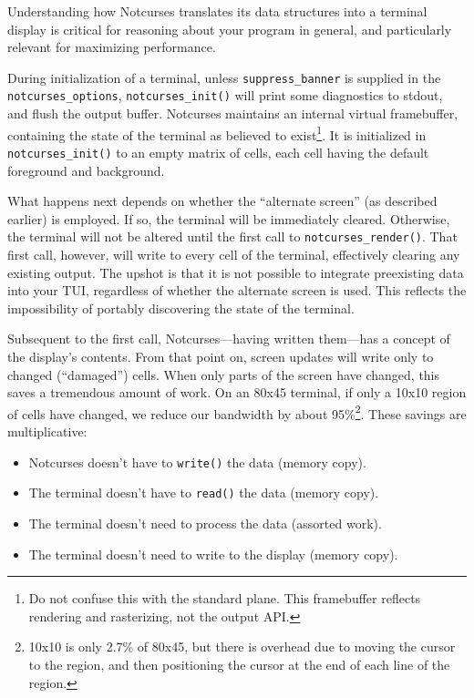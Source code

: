 \documentclass[letterpaper,10pt]{article}
\newenvironment{denseitemize}{
  \begin{itemize}
      \setlength{\itemsep}{0pt}
}{
  \end{itemize}
}
\begin{document}
Understanding how Notcurses translates its data structures into a terminal
display is critical for reasoning about your program in general, and particularly
relevant for maximizing performance.

During initialization of a terminal, unless \texttt{suppress\_banner} is supplied
in the \texttt{notcurses\_options}, \texttt{notcurses\_init()} will print some
diagnostics to stdout, and flush the output buffer. Notcurses maintains an
internal virtual framebuffer, containing the state of the terminal as believed
to exist\footnote{Do not confuse this with the standard plane. This framebuffer
reflects rendering and rasterizing, not the output API.}. It is initialized in
\texttt{notcurses\_init()} to an empty matrix of cells, each cell having the
default foreground and background.

What happens next depends on whether the ``alternate screen'' (as described
earlier) is employed. If so, the terminal will be immediately cleared.
Otherwise, the terminal will not be altered until the first call to
\texttt{notcurses\_render()}. That first call, however, will write to every
cell of the terminal, effectively clearing any existing output. The upshot is
that it is not possible to integrate preexisting data into your TUI, regardless
of whether the alternate screen is used. This reflects the impossibility of
portably discovering the state of the terminal.

Subsequent to the first call, Notcurses---having written them---has a concept
of the display's contents. From that point on, screen updates will write only
to changed (``damaged'') cells. When only parts of the screen have changed,
this saves a tremendous amount of work. On an 80x45 terminal, if only a 10x10
region of cells have changed, we reduce our bandwidth by about
95\%\footnote{10x10 is only 2.7\% of 80x45, but there is overhead due to moving
the cursor to the region, and then positioning the cursor at the end of each
line of the region.}. These savings are multiplicative:

\begin{denseitemize}
\item{Notcurses doesn't have to \texttt{write()} the data (memory copy).}
\item{The terminal doesn't have to \texttt{read()} the data (memory copy).}
\item{The terminal doesn't need to process the data (assorted work).}
\item{The terminal doesn't need to write to the display (memory copy).}
\end{denseitemize}
\end{document}
